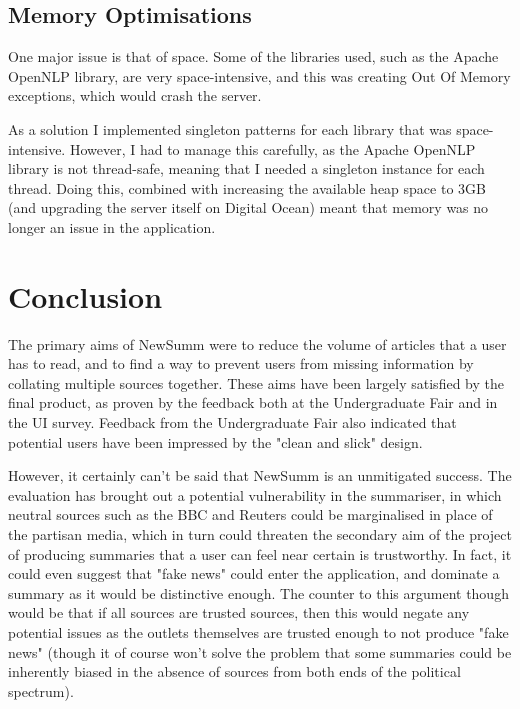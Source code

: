 \documentclass[12pt]{article}
\begin{document}
\subsection{Memory Optimisations}

One major issue is that of space. Some of the libraries used, such as the Apache OpenNLP library, are very space-intensive, and this was creating Out Of Memory exceptions, which would crash the server. 

As a solution I implemented singleton patterns for each library that was space-intensive. However, I had to manage this carefully, as the Apache OpenNLP library is not thread-safe, meaning that I needed a singleton instance for each thread. Doing this, combined with increasing the available heap space to 3GB (and upgrading the server itself on Digital Ocean) meant that memory was no longer an issue in the application.


\newpage

\section{Conclusion}

The primary aims of NewSumm were to reduce the volume of articles that a user has to read, and to find a way to prevent users from missing information by collating multiple sources together. These aims have been largely satisfied by the final product, as proven by the feedback both at the Undergraduate Fair and in the UI survey. Feedback from the Undergraduate Fair also indicated that potential users have been impressed by the "clean and slick" design.

However, it certainly can't be said that NewSumm is an unmitigated success. The evaluation has brought out a potential vulnerability in the summariser, in which neutral sources such as the BBC and Reuters could be marginalised in place of the partisan media, which in turn could threaten the secondary aim of the project of producing summaries that a user can feel near certain is trustworthy. In fact, it could even suggest that "fake news" could enter the application, and dominate a summary as it would be distinctive enough. The counter to this argument though would be that if all sources are trusted sources, then this would negate any potential issues as the outlets themselves are trusted enough to not produce "fake news" (though it of course won't solve the problem that some summaries could be inherently biased in the absence of sources from both ends of the political spectrum).
\end{document}
